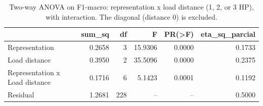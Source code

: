 \begin{table}[htbp]
\centering
\caption{Two-way ANOVA on F1-macro: representation x load distance (1, 2, or 3 HP), with interaction. The diagonal (distance 0) is excluded.}
\label{tab:anova}
\begin{tabular}{lrrrrr}
\toprule
 & sum\_sq & df & F & PR(>F) & eta\_sq\_parcial \\
\midrule
Representation & 0.2658 & 3 & 15.9306 & 0.0000 & 0.1733 \\
Load distance & 0.3950 & 2 & 35.5096 & 0.0000 & 0.2375 \\
Representation x Load distance & 0.1716 & 6 & 5.1423 & 0.0001 & 0.1192 \\
Residual & 1.2681 & 228 & -- & -- & 0.5000 \\
\bottomrule
\end{tabular}
\end{table}
